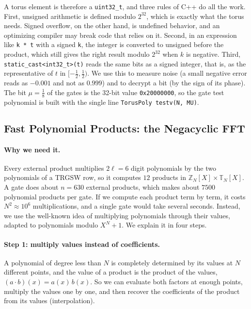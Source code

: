 \documentclass[12pt]{article}
\theoremstyle{plain}
\theoremstyle{definition}
\newcommand{\T}{\mathbb{T}}
\newcommand{\Z}{\mathbb{Z}}
\newcommand{\TN}{\T_N[X]}
\newcommand{\ZN}{\Z_N[X]}
\newcommand{\code}[1]{\texttt{#1}}
\begin{document}
A torus element is therefore a \code{uint32\_t}, and three rules of C++ do all
the work. First, unsigned arithmetic is defined modulo $2^{32}$, which is
exactly what the torus needs. Signed overflow, on the other hand, is undefined
behavior, and an optimizing compiler may break code that relies on it. Second,
in an expression like \code{k * t} with a signed \code{k}, the integer is
converted to unsigned before the product, which still gives the right result
modulo $2^{32}$ when $k$ is negative. Third, \code{static\_cast<int32\_t>(t)}
reads the same bits as a signed integer, that is, as the representative of $t$
in $[-\frac12,\frac12)$. We use this to measure noise (a small negative error
reads as $-0.001$ and not as $0.999$) and to decrypt a bit (by the sign of its
phase). The bit $\mu=\frac18$ of the gates is the 32-bit value
\texttt{0x20000000}, so the gate test polynomial is built with the single line
\code{TorusPoly testv(N, MU)}.

\subsection{Fast Polynomial Products: the Negacyclic FFT}
\label{sec:fft}

\paragraph{Why we need it.}
Every external product multiplies $2\ell=6$ digit polynomials by the two
polynomials of a TRGSW row, so it computes $12$ products in $\ZN\times\TN$.
A gate does about $n=630$ external products, which makes about $7500$
polynomial products per gate. If we compute each product term by term, it
costs $N^2\approx10^6$ multiplications, and a single gate would take several
seconds. Instead, we use the well-known idea of multiplying polynomials through
their values, adapted to polynomials modulo $X^N+1$. We explain it in four
steps.

\paragraph{Step 1: multiply values instead of coefficients.}
A polynomial of degree less than $N$ is completely determined by its values at
$N$ different points, and the value of a product is the product of the values,
$(a\cdot b)(x)=a(x)\,b(x)$. So we can evaluate both factors at enough points,
multiply the values one by one, and then recover the coefficients of the
product from its values (interpolation).
\end{document}

